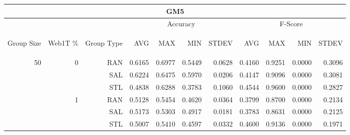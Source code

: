\begin{center}
\begin{table}[htbp] 
 \begin{center}
\begin{tabular}{ | r | r | r | r | r | r | r | r | r | r | r |}
\hline
\multicolumn{11}{|c|}{GM5}\\
\hline
 & & & \multicolumn{4}{|c|}{Accuracy} & \multicolumn{4}{|c|}{F-Score}\\ \cline{4-11}
\begin{sideways}Group Size\end{sideways} & \begin{sideways}Web1T \%\end{sideways} & \begin{sideways}Group Type\end{sideways} & \begin{sideways}AVG\end{sideways} & \begin{sideways}MAX\end{sideways} & \begin{sideways}MIN\end{sideways} & \begin{sideways}STDEV\end{sideways} & \begin{sideways}AVG\end{sideways} & \begin{sideways}MAX\end{sideways} & \begin{sideways}MIN\end{sideways} & \begin{sideways}STDEV\end{sideways}\\
\hline
\multirow{18}{*}{50}
 & \multirow{3}{*}{0} & RAN & 0.6165 & 0.6977 & 0.5449 & 0.0628 & 0.4160 & 0.9251 & 0.0000 & 0.3096\\ \cline{3-11}
 &   & SAL & 0.6224 & 0.6475 & 0.5970 & 0.0206 & 0.4147 & 0.9096 & 0.0000 & 0.3081\\ \cline{3-11}
 &   & STL & 0.4838 & 0.6288 & 0.3783 & 0.1060 & 0.4544 & 0.9600 & 0.0000 & 0.2827\\ \cline{2-11}
 & \multirow{3}{*}{1} & RAN & 0.5128 & 0.5454 & 0.4620 & 0.0364 & 0.3799 & 0.8700 & 0.0000 & 0.2134\\ \cline{3-11}
 &   & SAL & 0.5173 & 0.5303 & 0.4917 & 0.0181 & 0.3783 & 0.8631 & 0.0000 & 0.2125\\ \cline{3-11}
 &   & STL & 0.5007 & 0.5410 & 0.4597 & 0.0332 & 0.4600 & 0.9136 & 0.0000 & 0.1971\\ \cline{2-11}

\end{tabular}
\end{center}
\end{table}
\end{center}
